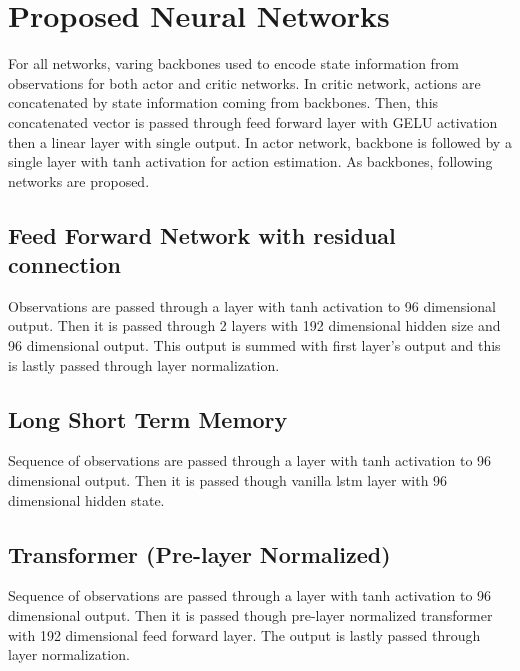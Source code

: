 \section{Proposed Neural Networks}
For all networks, varing backbones used to encode state information from observations for both actor and critic networks. In critic network, actions are concatenated by state information coming from backbones. Then, this concatenated vector is passed through feed forward layer with GELU activation then a linear layer with single output. In actor network, backbone is followed by a single layer with tanh activation for action estimation. As backbones, following networks are proposed. \\
\subsection{Feed Forward Network with residual connection}
Observations are passed through a layer with tanh activation to 96 dimensional output. Then it is passed through 2 layers with 192 dimensional hidden size and 96 dimensional output. This output is summed with first layer's output and this is lastly passed through layer normalization. \\
\subsection{Long Short Term Memory}
Sequence of observations are passed through a layer with tanh activation to 96 dimensional output. Then it is passed though vanilla lstm layer with 96 dimensional hidden state. \\
\subsection{Transformer (Pre-layer Normalized)}
Sequence of observations are passed through a layer with tanh activation to 96 dimensional output. Then it is passed though pre-layer normalized transformer with 192 dimensional feed forward layer. The output is lastly passed through layer normalization. \\
